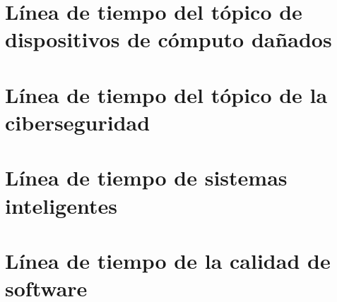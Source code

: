 \documentclass{article}
\begin{document}
\section{Línea de tiempo del tópico de dispositivos de cómputo dañados}

\pagebreak
\section{Línea de tiempo del tópico de la ciberseguridad}

\pagebreak
\section{Línea de tiempo de sistemas inteligentes}

\pagebreak
\section{Línea de tiempo de la calidad de software}

\end{document}
